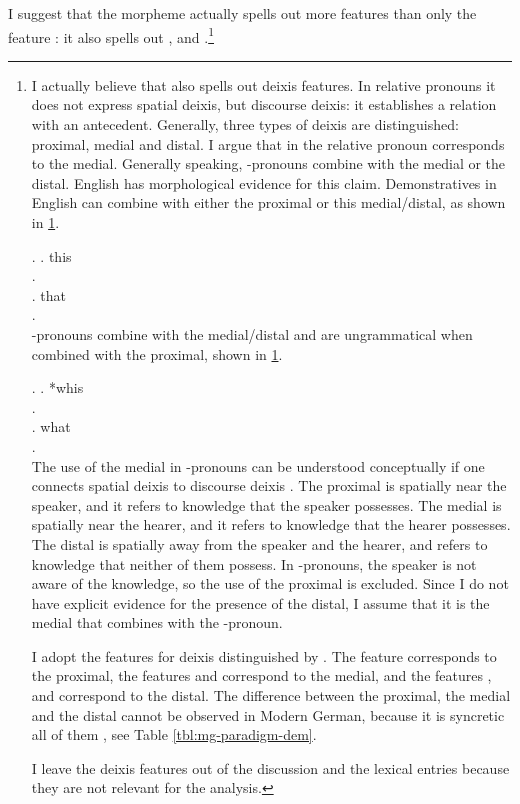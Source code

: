 I suggest that the morpheme  actually spells out more features than only the feature : it also spells out ,  and .\footnote{
I actually believe that  also spells out deixis features. In relative pronouns it does not express spatial deixis, but discourse deixis: it establishes a relation with an antecedent.
Generally, three types of deixis are distinguished: proximal, medial and distal. I argue that  in the relative pronoun corresponds to the medial. Generally speaking, -pronouns combine with the medial or the distal. English has morphological evidence for this claim. Demonstratives in English can combine with either the proximal or this medial/distal, as shown in \ref{ex:english-dem}.

\ex.\label{ex:english-dem}
 \ag. this\\
 .\\
 \bg. that\\
 .\\

-pronouns combine with the medial/distal and are ungrammatical when combined with the proximal, shown in \ref{ex:english-wh}.

\ex.\label{ex:english-wh}
 \ag. *whis\\
 .\\
 \bg. what\\
 .\\

The use of the medial in -pronouns can be understood conceptually if one connects spatial deixis to discourse deixis \citep[cf.][]{colasanti2019}. The proximal is spatially near the speaker, and it refers to knowledge that the speaker possesses. The medial is spatially near the hearer, and it refers to knowledge that the hearer possesses. The distal is spatially away from the speaker and the hearer, and refers to knowledge that neither of them possess. In -pronouns, the speaker is not aware of the knowledge, so the use of the proximal is excluded. Since I do not have explicit evidence for the presence of the distal, I assume that it is the medial that combines with the -pronoun.

I adopt the features for deixis distinguished by \citet{lander2018}. The feature  corresponds to the proximal, the features  and  correspond to the medial, and the features ,  and  correspond to the distal.
The difference between the proximal, the medial and the distal cannot be observed in Modern German, because it is syncretic all of them , see Table \ref{tbl:mg-paradigm-dem}.

I leave the deixis features out of the discussion and the lexical entries because they are not relevant for the analysis.}

